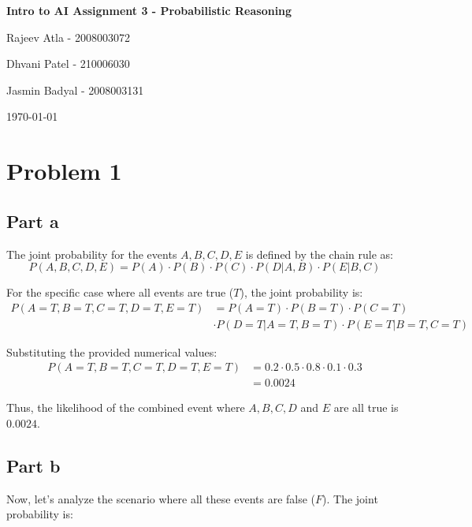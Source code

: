 \documentclass[12pt]{article}
\begin{document}
\begin{center}
    \Large
    \sffamily 
    \textbf{Intro to AI Assignment 3 - Probabilistic Reasoning}

    \vspace{0.5cm}

    \large
    {Rajeev Atla -
    2008003072\\}
    
    {Dhvani Patel -
    210006030\\}
    
    {Jasmin Badyal -
    2008003131\\}

    \vspace{0.5cm}

    \today
\end{center}

\section{Problem 1}

\subsection{Part a}

The joint probability for the events $A, B, C, D, E$ 
is defined by the chain rule as:
$$P(A, B, C, D, E) = P(A) \cdot P(B) \cdot P(C) \cdot P(D|A, B) \cdot P(E|B, C)$$

For the specific case where all events are true ($T$), 
the joint probability is:
\begin{align*}
    P(A=T, B=T, C=T, D=T, E=T) &= P(A=T) \cdot P(B=T) \cdot P(C=T) \\
    & \cdot P(D=T|A=T, B=T) \cdot P(E=T|B=T, C=T)
\end{align*}

Substituting the provided numerical values:
\begin{align*}
P(A=T, B=T, C=T, D=T, E=T) &= 0.2 \cdot 0.5 \cdot 0.8 \cdot 0.1 \cdot 0.3 \\
&= 0.0024
\end{align*}

Thus, 
the likelihood of the combined event where 
$A, B, C, D$ and $E$ are all true is $\boxed{0.0024}$.

\subsection{Part b}

Now, 
let's analyze the scenario where all these events are false ($F$). 
The joint probability is:
\end{document}

